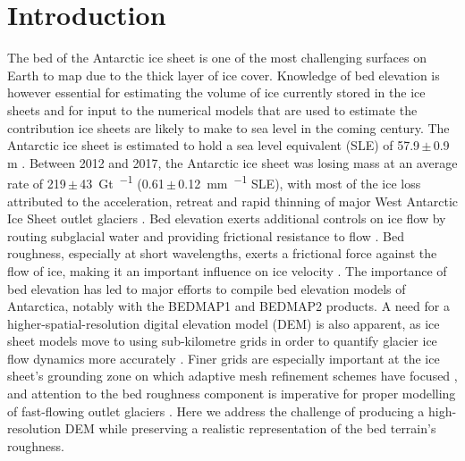 \section{Introduction} %

The bed of the Antarctic ice sheet is one of the most challenging surfaces on Earth to map due to the thick layer of ice cover.
Knowledge of bed elevation is however essential for estimating the volume of ice currently stored in the ice sheets and for input to the numerical models that are used to estimate the contribution ice sheets are likely to make to sea level in the coming century.
The Antarctic ice sheet is estimated to hold a sea level equivalent (SLE) of 57.9\,$\pm$\,0.9\,\unit{m} \citep{MorlighemDeepglacialtroughs2019}.
Between 2012 and 2017, the Antarctic ice sheet was losing mass at an average rate of 219\,$\pm$\,\SI{43}{\giga\tonne\per\year} (0.61\,$\pm$\,\SI{0.12}{\milli\metre\per\year} SLE), with most of the ice loss attributed to the acceleration, retreat and rapid thinning of major West Antarctic Ice Sheet outlet glaciers \citep{IMBIEMassbalanceAntarctic2018}.
Bed elevation exerts additional controls on ice flow by routing subglacial water and providing frictional resistance to flow \citep{SiegertMacroscalebedroughness2004}.
Bed roughness, especially at short wavelengths, exerts a frictional force against the flow of ice, making it an important influence on ice velocity \citep{BinghamDiverselandscapesPine2017,FalciniQuantifyingbedroughness2018}.
The importance of bed elevation has led to major efforts to compile bed elevation models of Antarctica, notably with the BEDMAP1 \citep{LytheBEDMAPnewice2001} and BEDMAP2 \citep{FretwellBedmap2improvedice2013} products.
A need for a higher-spatial-resolution digital elevation model (DEM) is also apparent, as ice sheet models move to using sub-kilometre grids in order to quantify glacier ice flow dynamics more accurately \citep{LeBrocqimprovedAntarcticdataset2010,Grahamhighresolutionsyntheticbed2017}.
Finer grids are especially important at the ice sheet's grounding zone on which adaptive mesh refinement schemes have focused \citep[e.g.][]{CornfordAdaptivemeshrefinement2016}, and attention to the bed roughness component is imperative for proper modelling of fast-flowing outlet glaciers \citep{DurandImpactbedrockdescription2011,NiasContrastingmodelledsensitivity2016}.
Here we address the challenge of producing a high-resolution DEM while preserving a realistic representation of the bed terrain's roughness.

